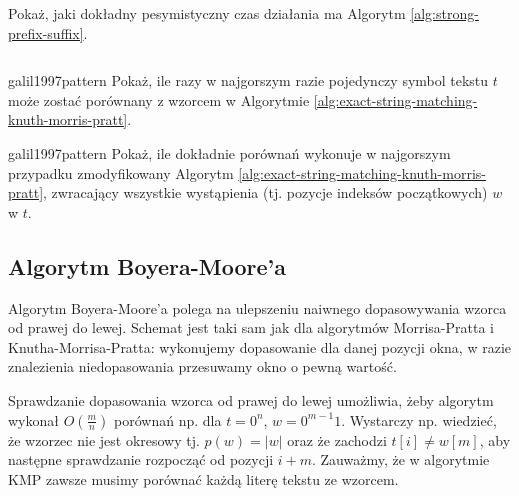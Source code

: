 \begin{code}
\inputminted{python}{code/other/strong-prefix-suffix.py}
\label{alg:strong-prefix-suffix}
\end{code}

\begin{problem}{}{}
  Pokaż, jaki dokładny pesymistyczny czas działania ma Algorytm \ref{alg:strong-prefix-suffix}.
\end{problem}


\begin{code}
\inputminted{python}{code/exact-string-matching/knuth-morris-pratt.py}
\label{alg:exact-string-matching-knuth-morris-pratt}
\end{code}

\begin{problem}{galil1997pattern}{}
  Pokaż, ile razy w najgorszym razie pojedynczy symbol tekstu $t$ może zostać porównany z wzorcem w Algorytmie \ref{alg:exact-string-matching-knuth-morris-pratt}.
\end{problem}

\begin{problem}{galil1997pattern}{}
  Pokaż, ile dokładnie porównań wykonuje w najgorszym przypadku zmodyfikowany Algorytm \ref{alg:exact-string-matching-knuth-morris-pratt}, zwracający wszystkie wystąpienia (tj. pozycje indeksów początkowych) $w$ w $t$.
\end{problem}

\subsection{Algorytm Boyera-Moore'a}

Algorytm Boyera-Moore'a polega na ulepszeniu naiwnego dopasowywania wzorca od prawej do lewej.
Schemat jest taki sam jak dla algorytmów Morrisa-Pratta i Knutha-Morrisa-Pratta: wykonujemy dopasowanie dla danej pozycji okna, w razie znalezienia niedopasowania przesuwamy okno o pewną wartość.

Sprawdzanie dopasowania wzorca od prawej do lewej umożliwia, żeby algorytm wykonał $O\left(\frac{m}{n}\right)$ porównań np. dla $t = 0^n$, $w = 0^{m - 1}1$. Wystarczy np. wiedzieć, że wzorzec nie jest okresowy tj. $p(w) = |w|$ oraz że zachodzi $t[i] \neq w[m]$, aby następne sprawdzanie rozpocząć od pozycji $i + m$. Zauważmy, że w algorytmie KMP zawsze musimy porównać każdą literę tekstu ze wzorcem.

